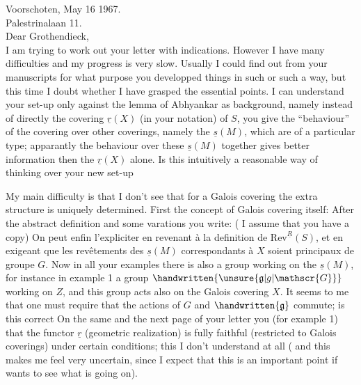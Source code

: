 Voorschoten, May 16 1967.\\
Palestrinalaan 11.\\

Dear Grothendieck,\\

I am trying to work out your letter with indications. However I have many difficulties and my progress is very slow. Usually I could find out from your manuscripts for what purpose you developped things in such or such a way, but this time I doubt whether I have grasped the essential points. I can understand your set-up only against the lemma of Abhyankar as background, namely instead of  directly the covering $\underline{r}(X)$ (in your notation) of $S$, you give the ``behaviour'' of the covering over other coverings, namely the $\underline{s}(M)$, which are of a particular type; apparantly the behaviour over  these $\underline{s}(M)$ together gives better information then the $\underline{r}(X)$ alone. Is this intuitively a reasonable way of thinking over your new set-up

My main difficulty is that I don't see that for a Galois covering the extra structure is uniquely determined. First the concept of Galois covering itself: After the abstract definition and some varations you write: ( I assume that you have a copy) On peut enfin l'expliciter en revenant à la definition de $\mathrm{Rev}^{\underline{R}}(S)$, et en exigeant que les revêtements des $\underline{s}(M)$ correspondants à $X$ soient principaux de groupe $G$. Now in all your examples there is also a group working on the $\underline{s}(M)$, for instance in example 1 a group $\handwritten{\unsure{\mathfrak{g}|g|\mathscr{G}}}$ working on $Z$, and this group acts also on the Galois covering  $X$. It seems to me that one must require that the actions of $G$ and $\handwritten{\mathfrak{g}}$ commute; is this correct On the same and the next page of your letter you  (for example 1) that the functor $\underline{r}$ (geometric realization) is fully faithful (restricted to Galois coverings) under certain conditions; this I don't understand at all ( and  this makes me feel very uncertain, since I expect that this is an important point  if  wants to see what is going on\handwritten{!}).

